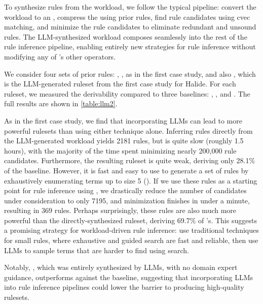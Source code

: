 To synthesize rules from the workload,
  we follow the typical \enumo pipeline:
  convert the workload to an \egraph,
  compress the \egraph using prior rules,
  find rule candidates using cvec matching, and
  minimize the rule candidates
  to eliminate redundant and unsound rules.
The LLM-synthesized workload composes seamlessly into the
rest of the rule inference pipeline, enabling entirely new
strategies for rule inference without modifying any of \enumo's other operators.

We consider four sets of prior rules:
  , ,  as in
  the first case study, and also
  , which is the LLM-generated ruleset from the
  first case study for Halide.
For each ruleset, we measured the \lhsandrhs derivability compared to
  three baselines: , , and .
The full results are shown in \autoref{table:llm2}.

As in the first case study, we find that incorporating LLMs can lead to more
  powerful rulesets than using either technique alone.
Inferring rules directly from the LLM-generated workload yields 2181 rules,
  but is quite slow (roughly 1.5 hours), with the majority of the time
  spent minimizing nearly 200,000 rule candidates.
Furthermore, the resulting ruleset is quite weak, deriving only 28.1\% of
  the  baseline.
However, it is fast and easy to use \enumo to generate a set of rules
  by exhaustively enumerating terms up to size 5 ().
If we use these rules as a starting point for rule inference using ,
  we drastically reduce the number of candidates under consideration to only 7195,
  and minimization finishes in under a minute, resulting in 369 rules.
Perhaps surprisingly, these rules are also much more powerful than
  the directly-synthesized ruleset, deriving 69.7\% of 's.
This suggests a promising strategy for workload-driven rule inference:
  use traditional techniques for small rules, where exhaustive and guided search
  are fast and reliable, then use LLMs to sample terms that are harder to find using search.

Notably, , which was entirely synthesized by LLMs,
  with no domain expert guidance,
  outperforms  against the  baseline,
  suggesting that incorporating LLMs into rule inference pipelines could
  lower the barrier to producing high-quality rulesets.

